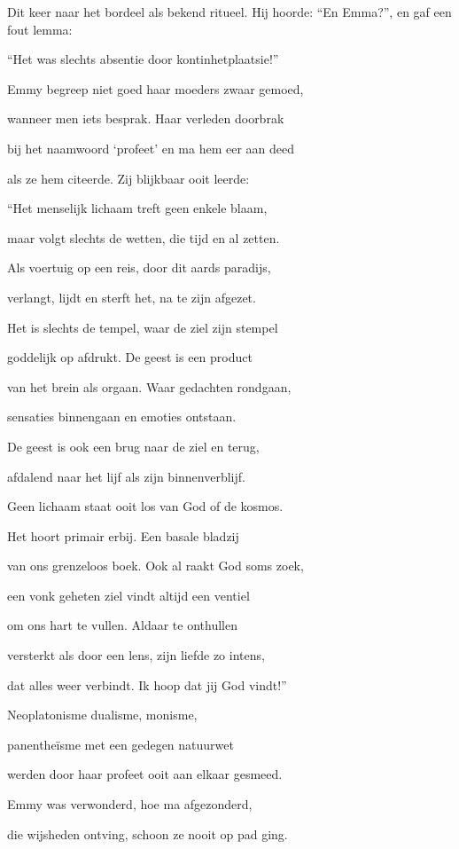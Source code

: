 Dit keer naar het bordeel
als bekend ritueel.
Hij hoorde: “En Emma?”,
en gaf een fout lemma:

“Het was slechts absentie
door kontinhetplaatsie!”

Emmy begreep niet goed
haar moeders zwaar gemoed,

wanneer men iets besprak.
Haar verleden doorbrak

bij het naamwoord ‘profeet’
en ma hem eer aan deed

als ze hem citeerde.
Zij blijkbaar ooit leerde:

“Het menselijk lichaam
treft geen enkele blaam,

maar volgt slechts de wetten,
die tijd en al zetten.

Als voertuig op een reis,
door dit aards paradijs,

verlangt, lijdt en sterft het,
na te zijn afgezet.

Het is slechts de tempel,
waar de ziel zijn stempel

goddelijk op afdrukt.
De geest is een product

van het brein als orgaan.
Waar gedachten rondgaan,

sensaties binnengaan
en emoties ontstaan.

De geest is ook een brug
naar de ziel en terug,

afdalend naar het lijf
als zijn binnenverblijf.

Geen lichaam staat ooit los
van God of de kosmos.

Het hoort primair erbij.
Een basale bladzij

van ons grenzeloos boek.
Ook al raakt God soms zoek,

een vonk geheten ziel
vindt altijd een ventiel

om ons hart te vullen.
Aldaar te onthullen

versterkt als door een lens,
zijn liefde zo intens,

dat alles weer verbindt.
Ik hoop dat jij God vindt!”

Neoplatonisme
dualisme, monisme,

panentheïsme met
een gedegen natuurwet

werden door haar profeet
ooit aan elkaar gesmeed.

Emmy was verwonderd,
hoe ma afgezonderd,

die wijsheden ontving,
schoon ze nooit op pad ging.
